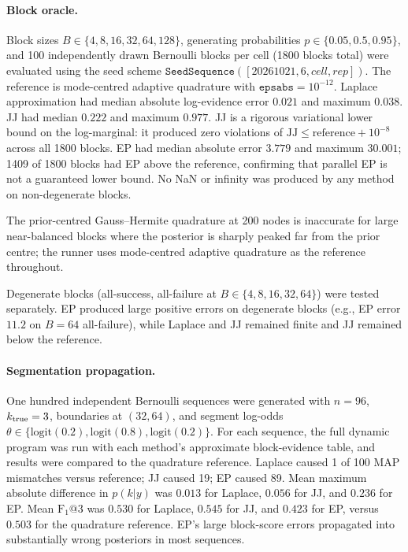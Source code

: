 \paragraph{Block oracle.}
Block sizes $B\in\{4,8,16,32,64,128\}$, generating probabilities
$p\in\{0.05,0.5,0.95\}$, and 100 independently drawn Bernoulli blocks per cell
(1800 blocks total) were evaluated using the seed scheme
$\mathtt{SeedSequence}([20261021, 6, \textit{cell}, \textit{rep}])$.
The reference is mode-centred adaptive quadrature with $\texttt{epsabs}=10^{-12}$.
Laplace approximation had median absolute log-evidence error $0.021$ and maximum $0.038$.
JJ had median $0.222$ and maximum $0.977$.
JJ is a rigorous variational lower bound on the log-marginal: it produced zero
violations of $\mathrm{JJ}\le\mathrm{reference}+10^{-8}$ across all 1800 blocks.
EP had median absolute error $3.779$ and maximum $30.001$; 1409 of 1800 blocks had
EP above the reference, confirming that parallel EP is not a guaranteed lower bound.
No NaN or infinity was produced by any method on non-degenerate blocks.

The prior-centred Gauss--Hermite quadrature at 200 nodes is inaccurate for large
near-balanced blocks where the posterior is sharply peaked far from the prior centre;
the runner uses mode-centred adaptive quadrature as the reference throughout.

Degenerate blocks (all-success, all-failure at $B\in\{4,8,16,32,64\}$) were tested
separately. EP produced large positive errors on degenerate blocks (e.g., EP error
$11.2$ on $B=64$ all-failure), while Laplace and JJ remained finite and JJ remained
below the reference.

\paragraph{Segmentation propagation.}
One hundred independent Bernoulli sequences were generated with $n=96$,
$k_{\rm true}=3$, boundaries at $(32,64)$, and segment log-odds
$\theta\in\{\mathrm{logit}(0.2),\mathrm{logit}(0.8),\mathrm{logit}(0.2)\}$.
For each sequence, the full dynamic program was run with each method's approximate
block-evidence table, and results were compared to the quadrature reference.
Laplace caused 1 of 100 MAP mismatches versus reference; JJ caused 19; EP caused 89.
Mean maximum absolute difference in $p(k|y)$ was $0.013$ for Laplace, $0.056$ for JJ,
and $0.236$ for EP. Mean $\mathrm{F}_1@3$ was $0.530$ for Laplace, $0.545$ for JJ,
and $0.423$ for EP, versus $0.503$ for the quadrature reference.
EP's large block-score errors propagated into substantially wrong posteriors in most
sequences.

